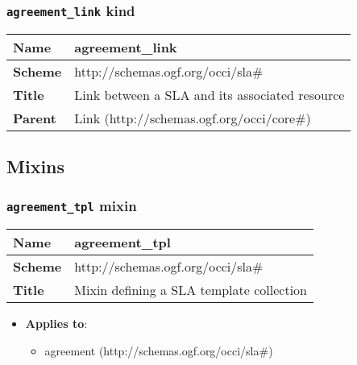 \subsubsection{\texttt{agreement\_link} kind}
\begin{center}
\begin{tabular}{|l|l|}
  \hline
  \textbf{Name} & agreement\_link \\
  \hline  
  \textbf{Scheme} & http://schemas.ogf.org/occi/sla\# \\
  \hline
  \textbf{Title} & Link between a SLA and its associated resource \\
  \hline
  \textbf{Parent} & Link (http://schemas.ogf.org/occi/core\#) \\
  \hline
\end{tabular}
\end{center}



\subsection{Mixins}
\subsubsection{\texttt{agreement\_tpl} mixin}
\begin{center}
\begin{tabular}{|l|l|}
  \hline
  \textbf{Name} & agreement\_tpl \\
  \hline  
  \textbf{Scheme} & http://schemas.ogf.org/occi/sla\# \\
  \hline
  \textbf{Title} & Mixin defining a SLA template collection \\
  \hline
\end{tabular}
\end{center}
\begin{itemize}
\item \textbf{Applies to}:
\begin{itemize}
	\item agreement (http://schemas.ogf.org/occi/sla\#)
\end{itemize}
\end{itemize} 



 
